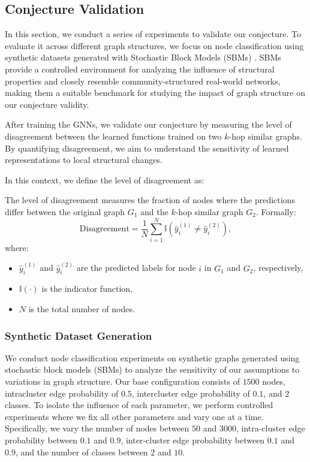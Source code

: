 \subsection{Conjecture Validation}
In this section, we conduct a series of experiments to validate our conjecture. To evaluate it across different graph structures, we focus on node classification using synthetic datasets generated with Stochastic Block Models (SBMs) \cite{stochastic_block_models}. SBMs provide a controlled environment for analyzing the influence of structural properties and closely resemble community-structured real-world networks, making them a suitable benchmark for studying the impact of graph structure on our conjecture validity.

After training the GNNs, we validate our conjecture by measuring the level of disagreement between the learned functions trained on two $k$-hop similar graphs. By quantifying disagreement, we aim to understand the sensitivity of learned representations to local structural changes. 

In this context, we define the level of disagreement as: 
\begin{definition}
The level of disagreement measures the fraction of nodes where the predictions differ between the original graph $ G_1 $ and the $k$-hop similar graph $ G_2 $. Formally:
\[
\text{Disagreement} = \frac{1}{N} \sum_{i=1}^N \mathbb{I}(\hat{y}_i^{(1)} \neq \hat{y}_i^{(2)}),
\]
where:
\begin{itemize}
    \item $ \hat{y}_i^{(1)} $ and $ \hat{y}_i^{(2)} $ are the predicted labels for node $ i $ in $ G_1 $ and $ G_2 $, respectively,
    \item $ \mathbb{I}(\cdot) $ is the indicator function,
    \item $ N $ is the total number of nodes.
\end{itemize}
\end{definition}
\subsubsection{Synthetic Dataset Generation}
We conduct node classification experiments on synthetic graphs generated using stochastic block models (SBMs) to analyze the sensitivity of our assumptions to variations in graph structure. Our base configuration consists of $1500$ nodes, intracluster edge probability of $0.5$, intercluster edge probability of $0.1$, and $2$ classes. To isolate the influence of each parameter, we perform controlled experiments where we fix all other parameters and vary one at a time. Specifically, we vary the number of nodes between $50$ and $3000$, intra-cluster edge probability between $0.1$ and $0.9$, inter-cluster edge probability between $0.1$ and $0.9$, and the number of classes between $2$ and $10$.

